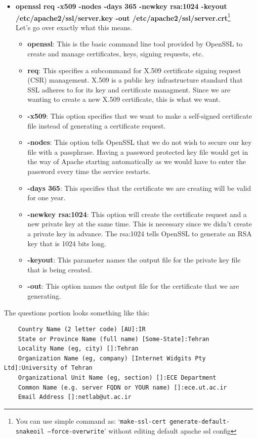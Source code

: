 \documentclass[10pt,a4paper]{article}
\numberwithin{equation}{section}
\numberwithin{figure}{section}
\numberwithin{table}{section}
\begin{document}
	\begin{itemize}
		\item \textbf{openssl req -x509 -nodes -days 365 -newkey rsa:1024 -keyout /etc/apache2/ssl/server.key -out /etc/apache2/ssl/server.crt}\footnote{You can use simple command as: `\texttt{make-ssl-cert generate-default-snakeoil --force-overwrite}' without editing default apache ssl config}\\
		Let's go over exactly what this means.\\
		\begin{itemize}
			\item \textbf{openssl}: This is the basic command line tool provided by OpenSSL to create and manage certificates, keys, signing requests, etc.
			\item \textbf{req}: This specifies a subcommand for X.509 certificate signing request (CSR) management. X.509 is a public key infrastructure standard that SSL adheres to for its key and certificate managment. Since we are wanting to create a new X.509 certificate, this is what we want.
			\item \textbf{-x509}: This option specifies that we want to make a self-signed certificate file instead of generating a certificate request.
			\item \textbf{-nodes}: This option tells OpenSSL that we do not wish to secure our key file with a passphrase. Having a password protected key file would get in the way of Apache starting automatically as we would have to enter the password every time the service restarts.
			\item \textbf{-days 365}: This specifies that the certificate we are creating will be valid for one year.
			\item \textbf{-newkey rsa:1024}: This option will create the certificate request and a new private key at the same time. This is necessary since we didn't create a private key in advance. The rsa:1024 tells OpenSSL to generate an RSA key that is 1024 bits long.
			\item \textbf{-keyout}: This parameter names the output file for the private key file that is being created.
			\item \textbf{-out}: This option names the output file for the certificate that we are generating.	
		\end{itemize}
	\end{itemize}

	The questions portion looks something like this:
	\begin{verbatim}
	Country Name (2 letter code) [AU]:IR 
	State or Province Name (full name) [Some-State]:Tehran 
	Locality Name (eg, city) []:Tehran 
	Organization Name (eg, company) [Internet Widgits Pty Ltd]:University of Tehran 
	Organizational Unit Name (eg, section) []:ECE Department 
	Common Name (e.g. server FQDN or YOUR name) []:ece.ut.ac.ir 
	Email Address []:netlab@ut.ac.ir 
	\end{verbatim}
\end{document}
